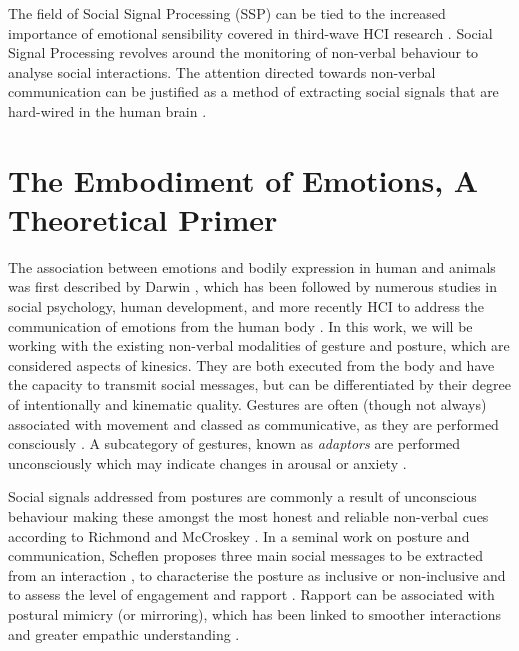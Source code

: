 The field of Social Signal Processing (SSP) can be tied to the increased importance of emotional sensibility covered in third-wave HCI research \cite{cristescu_emotions_2008}. Social Signal Processing revolves around the monitoring of non-verbal behaviour to analyse social interactions. The attention directed towards non-verbal communication can be justified as a method of extracting social signals that are hard-wired in the human brain \cite{vinciarelli_social_2009-1}.

\section{The Embodiment of Emotions, A Theoretical Primer}
\label{background:ebodiment_emotions}

The association between emotions and bodily expression in human and animals was first described by Darwin \cite{darwin_expression_2013}, which has been followed by numerous studies in social psychology, human development, and more recently HCI \cite{alaoui_movement_2012, gillies_creating_2018, fdili_alaoui_strategies_2015} to address the communication of emotions from the human body \cite{gunes_lab_2008}. In this work, we will be working with the existing non-verbal modalities of gesture and posture, which are considered aspects of kinesics. They are both executed from the body and have the capacity to transmit social messages, but can be differentiated by their degree of intentionally and kinematic quality. Gestures are often (though not always) associated with movement and classed as communicative, as they are performed consciously \cite{vinciarelli_towards_2011}. A subcategory of gestures, known as \textit{adaptors} are performed unconsciously which may indicate changes in arousal or anxiety \cite{hans_kinesics_2015, neff_dont_2011}.

Social signals addressed from postures are commonly a result of unconscious behaviour making these amongst the most honest and reliable non-verbal cues according to Richmond and McCroskey \cite{richmond_nonverbal_2011}. In a seminal work on posture and communication, Scheflen proposes three main social messages to be extracted from an interaction \cite{scheflen_significance_1964}, to characterise the posture as inclusive or non-inclusive and to assess the level of engagement and rapport \cite{vinciarelli_social_2009}. Rapport can be associated with postural mimicry (or mirroring), which has been linked to smoother interactions and greater empathic understanding \cite{chartrand_chameleon_1999}.

